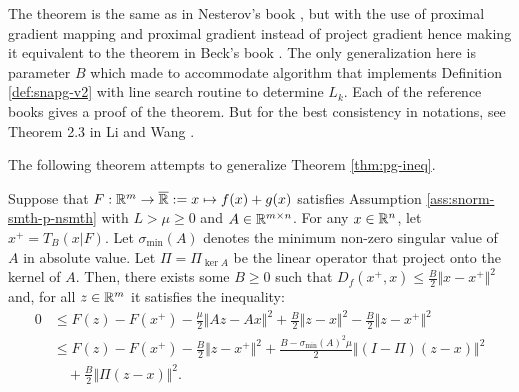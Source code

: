 \documentclass[12pt]{article}
\begin{document}
            \begin{remark}
                The theorem is the same as in Nesterov's book \cite[Theorem 2.2.13]{nesterov_lectures_2018}, but with the use of proximal gradient mapping and proximal gradient instead of project gradient hence making it equivalent to the theorem in Beck's book \cite[Theorem 10.16]{beck_first-order_2017}. 
                The only generalization here is parameter $B$ which made to accommodate algorithm that implements Definition \ref{def:snapg-v2} with line search routine to determine $L_k$. 
                Each of the reference books gives a proof of the theorem. 
                But for the best consistency in notations, see Theorem 2.3 in Li and Wang \cite{li_relaxed_2025}. 
            \end{remark}
            The following theorem attempts to generalize Theorem \ref{thm:pg-ineq}. 
            \begin{theorem}\label{thm:pg-ineq-semi-scnvx}
                Suppose that $F:\mathbb R^m \rightarrow \overline {\mathbb R} := x \mapsto f(x) + g(x)$ satisfies Assumption \ref{ass:snorm-smth-p-nsmth} with $L > \mu \ge 0$ and $A \in \mathbb R^{m\times n}$. 
                For any $x \in \mathbb R^n$, let $x^+ = T_B(x | F)$. 
                Let $\sigma_{\min}(A)$ denotes the minimum non-zero singular value of $A$ in absolute value. 
                Let $\Pi = \Pi_{\ker A}$ be the linear operator that project onto the kernel of $A$. 
                Then, there exists some $B \ge 0$ such that $D_f(x^+, x) \le \frac{B}{2}\Vert x - x^+\Vert^2$ and, for all $z \in \mathbb R^m$ it satisfies the inequality: 
                \begin{align*}
                    0 &\le F(z) - F(x^+) 
                    - \frac{\mu}{2}\Vert Az - Ax\Vert^2 
                    + \frac{B}{2}\Vert z - x\Vert^2
                    - \frac{B}{2}\Vert z - x^+\Vert^2
                    \\
                    &\le F(z) - F(x^+)
                    - \frac{B}{2}\Vert z - x^+\Vert^2 
                    + \frac{B - \sigma_{\min}(A)^2\mu}{2}\Vert (I - \Pi)(z - x) \Vert^2
                        \\ &\quad 
                        + \frac{B}{2}\Vert \Pi(z - x)\Vert^2. 
                \end{align*}
            \end{theorem}
\end{document}
